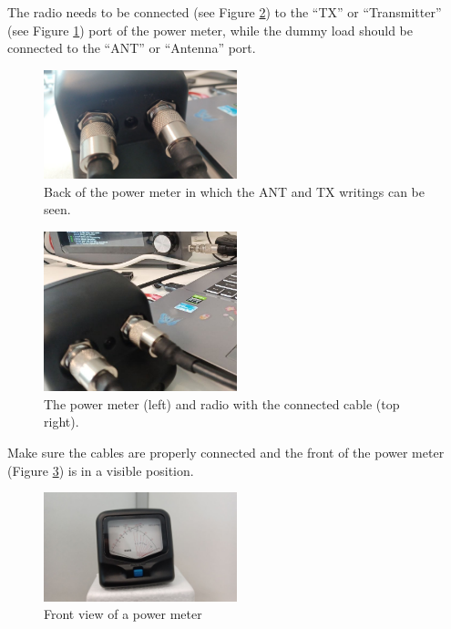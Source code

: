 \documentclass[11pt,a4paper]{article}
\begin{document}
The radio needs to be connected (see Figure \ref{fig:backview4}) to the ``TX'' or ``Transmitter'' (see Figure \ref{fig:backview2}) port of the power meter, while the dummy load
should be connected to the ``ANT'' or ``Antenna'' port.

\begin{figure}[!ht]
  \centering
  \includegraphics[width=0.5\textwidth]{pictures/wattmeter_2.jpeg}
  \caption{Back of the power meter in which the ANT and TX writings can be seen.}
  \label{fig:backview2}
\end{figure}

\begin{figure}[!ht]
  \centering
  \includegraphics[width=0.5\textwidth]{pictures/wattmeter_4-edited.jpeg}
  \caption{The power meter (left) and radio with the connected cable (top right).}
  \label{fig:backview4}
\end{figure}

Make sure the cables are properly connected and the front of the power meter (Figure \ref{fig:frontview1})
is in a visible position.

\begin{figure}[!ht]
  \centering
  \includegraphics[width=0.5\textwidth]{pictures/wattmeter_5.jpeg}
  \caption{Front view of a power meter}
  \label{fig:frontview1}
\end{figure}
\end{document}
